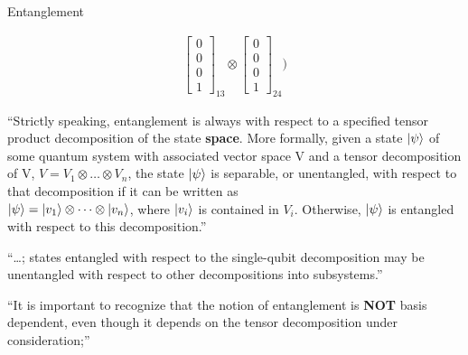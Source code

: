 \documentclass{beamer}
\begin{document}
\begin{frame}{Entanglement}
{\begin{align*}
                                  \begin{bmatrix} 0 \\ 0 \\ 0 \\ 1 \end{bmatrix}_{13} \otimes  \begin{bmatrix} 0 \\ 0 \\ 0 \\ 1 \end{bmatrix}_{24} )
    \end{align*}

    “Strictly speaking, entanglement is always with respect to a specified tensor product decomposition of the state \textbf{space}.
    More formally, given a state $\ket\psi$ of some quantum system with associated vector space V and a tensor decomposition of V, $V = V_1 \otimes \dots \otimes V_n$,
    the state $\ket\psi$ is separable, or unentangled, with respect to that decomposition if it can be written as \\
    $\ket\psi = \ket{v_1} \otimes \dots \otimes \ket{v_n} $, where $\ket{v_i}$ is contained in $V_i$. Otherwise, $\ket\psi$ is entangled with respect to this decomposition.”
    \par
    “\dots; states entangled with respect to the single-qubit decomposition may be unentangled with respect to other decompositions into subsystems.”
    \par
    “It is important to recognize that the notion of entanglement is \textbf{NOT} basis dependent, even though it depends on the tensor decomposition under consideration;”
  }%
\end{frame}
\end{document}
